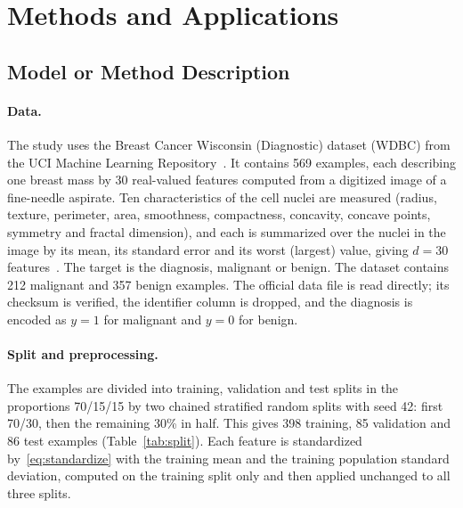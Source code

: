 \section{Methods and Applications}
\label{sec:methods}

\subsection{Model or Method Description}
\label{sec:model}

\paragraph{Data.}
The study uses the Breast Cancer Wisconsin (Diagnostic) dataset (WDBC) from the UCI Machine Learning Repository~\cite{wdbc}. It contains 569 examples, each describing one breast mass by 30 real-valued features computed from a digitized image of a fine-needle aspirate. Ten characteristics of the cell nuclei are measured (radius, texture, perimeter, area, smoothness, compactness, concavity, concave points, symmetry and fractal dimension), and each is summarized over the nuclei in the image by its mean, its standard error and its worst (largest) value, giving $d=30$ features~\cite{street1993}. The target is the diagnosis, malignant or benign. The dataset contains 212 malignant and 357 benign examples. The official data file is read directly; its checksum is verified, the identifier column is dropped, and the diagnosis is encoded as $y=1$ for malignant and $y=0$ for benign.

\paragraph{Split and preprocessing.}
The examples are divided into training, validation and test splits in the proportions 70/15/15 by two chained stratified random splits with seed 42: first 70/30, then the remaining 30\% in half. This gives 398 training, 85 validation and 86 test examples (Table~\ref{tab:split}). Each feature is standardized by~\eqref{eq:standardize} with the training mean and the training population standard deviation, computed on the training split only and then applied unchanged to all three splits.

